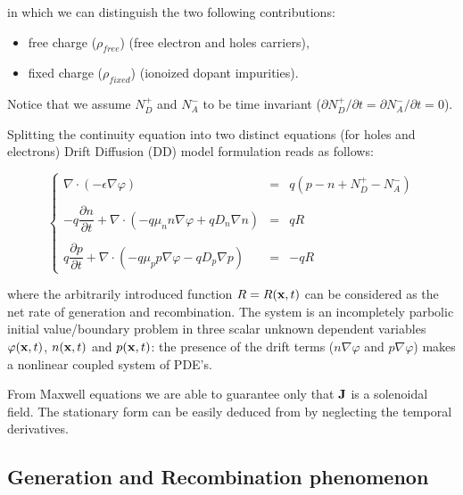 in which we can distinguish the two following contributions:

\begin{itemize}
\item free charge ($\rho_{free}$) (free electron and holes carriers),
\item fixed charge ($\rho_{fixed}$) (ionoized dopant impurities).
\end{itemize} 


 Notice that we assume $N_D^+$ and $N_A^-$ to be time invariant ($\partial N_D^+ / \partial t=\partial N_A^- / \partial t = 0$).

 Splitting the continuity equation  into two distinct equations (for holes and electrons) Drift Diffusion (DD) model formulation reads as follows:
  
\begin{equation}
\label{eq: full problem}
\left\{
\begin{array}{rcl}
\nabla \cdot (-\epsilon \nabla \varphi) & = & q(p-n+N_D^+-N_A^-)\\ \\
-q\dfrac{\partial n}{\partial t} + \nabla \cdot ( - q\mu_n n \nabla \varphi + qD_n \nabla n )& = & qR\\ \\
q\dfrac{\partial p}{\partial t} + \nabla \cdot (- q\mu_p p \nabla \varphi - qD_p \nabla p )& = & -qR 
\end{array}
\right.
\end{equation}

where the arbitrarily introduced function $R=R(\mathbf{x},t)$ can be considered as the net rate of generation and recombination.
The system is an incompletely parbolic initial value/boundary problem in three scalar unknown dependent variables $\varphi(\mathbf{x},t)$, $n(\mathbf{x},t)$ and $p(\mathbf{x},t)$: the presence of the drift terms ($n\nabla \varphi$ and $p \nabla 	\varphi$) makes  a nonlinear coupled system of PDE's. 

From Maxwell equations we are able to guarantee only that $\mathbf{J}$ is a solenoidal field.
The stationary form can be easily deduced from  by neglecting the temporal derivatives.





\subsection{Generation and Recombination phenomenon}
\label{subsection: RG}


